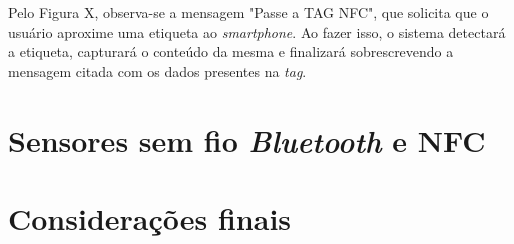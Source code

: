 \documentclass[
	article,			%
	12pt,				%
	oneside,			%
	a4paper,			%
	english,			%
	brazil,				%
	sumario=tradicional
	]{abntex2}
\begin{document}

Pelo Figura X, observa-se a mensagem "Passe a TAG NFC", que solicita que o usuário aproxime uma etiqueta ao \textit{smartphone}. Ao fazer isso, o sistema detectará a etiqueta, capturará o conteúdo da mesma e finalizará sobrescrevendo a mensagem citada com os dados presentes na \textit{tag}.


\section{Sensores sem fio \textit{Bluetooth} e NFC}


% 

\section*{Considerações finais}


\postextual







\begin{apendicesenv}

\end{apendicesenv}


\begin{anexosenv}



\end{anexosenv}
\end{document}

